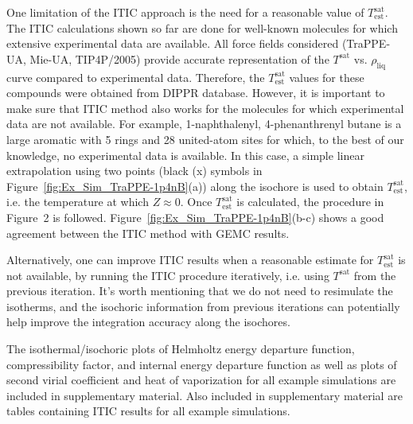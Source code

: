 \documentclass[5p,times]{elsarticle}
\begin{document}

One limitation of the ITIC approach is the need for a reasonable value of $T_\mathrm{est}^\mathrm{sat}$. The ITIC calculations shown so far are done for well-known molecules for which extensive experimental data are available. All force fields considered (TraPPE-UA, Mie-UA, TIP4P/2005) provide accurate representation of the $T^\mathrm{sat}$ vs. $\rho_\mathrm{liq}$ curve compared to experimental data. Therefore, the $T_\mathrm{est}^\mathrm{sat}$ values for these compounds were obtained from DIPPR database. However, it is important to make sure that ITIC method also works for the molecules for which experimental data are not available. For example, 1-naphthalenyl, 4-phenanthrenyl butane is a large aromatic with 5 rings and 28 united-atom sites for which, to the best of our knowledge, no experimental data is available. In this case, a simple linear extrapolation using two points (black (x) symbols in Figure~\ref{fig:Ex_Sim_TraPPE-1p4nB}(a)) along the isochore is used to obtain $T_\mathrm{est}^\mathrm{sat}$, i.e. the temperature at which $Z\approx0$. Once $T_\mathrm{est}^\mathrm{sat}$ is calculated, the procedure in Figure~2 is followed. Figure~\ref{fig:Ex_Sim_TraPPE-1p4nB}(b-c) shows a good agreement between the ITIC method with GEMC results.

Alternatively, one can improve ITIC results when a reasonable estimate for $T_\mathrm{est}^\mathrm{sat}$ is not available, by running the ITIC procedure iteratively, i.e. using $T^\mathrm{sat}$ from the previous iteration. It's worth mentioning that we do not need to resimulate the isotherms, and the isochoric information from previous iterations can potentially help improve the integration accuracy along the isochores. 

The isothermal/isochoric plots of Helmholtz energy departure function, compressibility factor, and internal energy departure function as well as plots of second virial coefficient and heat of vaporization for all example simulations are included in supplementary material. Also included in supplementary material are tables containing ITIC results for all example simulations.
\end{document}
